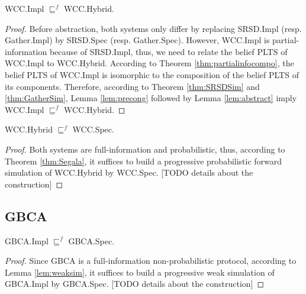 \begin{lemma}\label{lem:WCCSubst}
    \textsf{WCC.Impl} $\sqsubseteq^f$ \textsf{WCC.Hybrid}.
\end{lemma}
\begin{proof}
    Before abstraction, both systems only differ by replacing \textsf{SRSD.Impl} (resp.
    \textsf{Gather.Impl}) by \textsf{SRSD.Spec} (resp. \textsf{Gather.Spec}).
    However, \textsf{WCC.Impl} is partial-information because of \textsf{SRSD.Impl},
    thus, we need to relate the belief PLTS of \textsf{WCC.Impl} to \textsf{WCC.Hybrid}.
    According to Theorem \ref{thm:partialinfocompo}, the belief PLTS of \textsf{WCC.Impl}
    is isomorphic to the composition of the belief PLTS of its components.
    Therefore, according to Theorem \ref{thm:SRSDSim} and \ref{thm:GatherSim},
    Lemma \ref{lem:precong} followed by Lemma \ref{lem:abstract} imply \textsf{WCC.Impl}
    $\sqsubseteq^f$ \textsf{WCC.Hybrid}.
\end{proof}

\begin{lemma}\label{lem:WCCCore}
    \textsf{WCC.Hybrid} $\sqsubseteq^f$ \textsf{WCC.Spec}.
\end{lemma}
\begin{proof}
    Both systems are full-information and probabilistic, thus, according to
    Theorem \ref{thm:Segala}, it suffices to build a progressive probabilistic
    forward simulation of \textsf{WCC.Hybrid} by \textsf{WCC.Spec}.
    [TODO details about the construction]
\end{proof}

\subsection{GBCA}

\begin{theorem}\label{thm:GBCASim}
    \textsf{GBCA.Impl} $\sqsubseteq^f$ \textsf{GBCA.Spec}.
\end{theorem}
\begin{proof}
    Since \textsf{GBCA} is a full-information non-probabilistic protocol, according to Lemma
    \ref{lem:weaksim}, it suffices to build a progressive weak simulation
    of \textsf{GBCA.Impl} by \textsf{GBCA.Spec}.
    [TODO details about the construction]
\end{proof}

